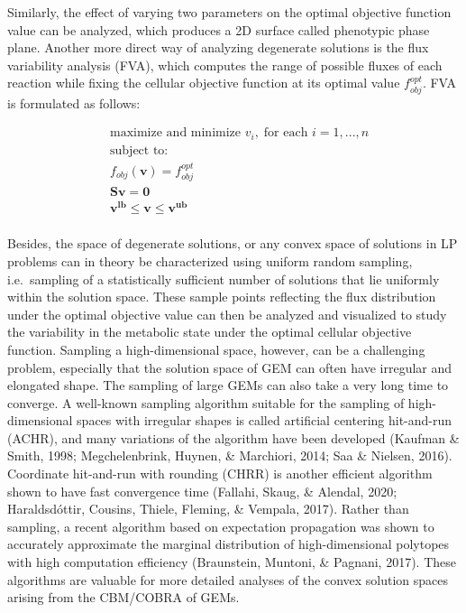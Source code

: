 \documentclass[12pt,twoside,openany,\mydriver]{thesis}  %
\begin{document}
Similarly, the effect of varying two parameters on the optimal objective function value can be analyzed, which produces a 2D surface called phenotypic phase plane. Another more direct way of analyzing degenerate solutions is the flux variability analysis (FVA), which computes the range of possible fluxes of each reaction while fixing the cellular objective function at its optimal value \(f_{obj}^{opt}\). FVA is formulated as follows:

\[
\begin{aligned}
&\text{maximize and minimize } v_{i},\; \text{for each } i=1,...,n \\
&\text{subject to:} \\
&f_{obj}(\mathbf{v}) = f_{obj}^{opt}\\
&\mathbf{Sv = 0} \\
&\mathbf{v^{lb} \le v \le v^{ub}} \\
\end{aligned}
\]

Besides, the space of degenerate solutions, or any convex space of solutions in LP problems can in theory be characterized using uniform random sampling, i.e.~sampling of a statistically sufficient number of solutions that lie uniformly within the solution space. These sample points reflecting the flux distribution under the optimal objective value can then be analyzed and visualized to study the variability in the metabolic state under the optimal cellular objective function. Sampling a high-dimensional space, however, can be a challenging problem, especially that the solution space of GEM can often have irregular and elongated shape. The sampling of large GEMs can also take a very long time to converge. A well-known sampling algorithm suitable for the sampling of high-dimensional spaces with irregular shapes is called artificial centering hit-and-run (ACHR), and many variations of the algorithm have been developed (Kaufman \& Smith, 1998; Megchelenbrink, Huynen, \& Marchiori, 2014; Saa \& Nielsen, 2016). Coordinate hit-and-run with rounding (CHRR) is another efficient algorithm shown to have fast convergence time (Fallahi, Skaug, \& Alendal, 2020; Haraldsdóttir, Cousins, Thiele, Fleming, \& Vempala, 2017). Rather than sampling, a recent algorithm based on expectation propagation was shown to accurately approximate the marginal distribution of high-dimensional polytopes with high computation efficiency (Braunstein, Muntoni, \& Pagnani, 2017). These algorithms are valuable for more detailed analyses of the convex solution spaces arising from the CBM/COBRA of GEMs.
\end{document}
